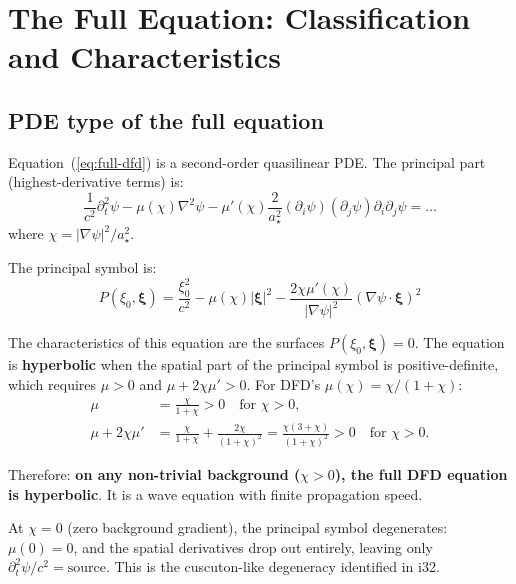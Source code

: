 \documentclass[12pt,a4paper]{article}
\begin{document}
\section{The Full Equation: Classification and Characteristics}
\label{sec:classification}

\subsection{PDE type of the full equation}

Equation~(\ref{eq:full-dfd}) is a second-order quasilinear PDE. The principal
part (highest-derivative terms) is:
\begin{equation}
\frac{1}{c^2}\partial_t^2\psi
- \mu(\chi)\nabla^2\psi
- \mu'(\chi)\frac{2}{a_\star^2}(\partial_i\psi)(\partial_j\psi)\partial_i\partial_j\psi = \ldots
\end{equation}
where $\chi = |\nabla\psi|^2/a_\star^2$.

The principal symbol is:
\begin{equation}
P(\xi_0, \boldsymbol{\xi}) = \frac{\xi_0^2}{c^2}
- \mu(\chi)|\boldsymbol{\xi}|^2
- \frac{2\chi\mu'(\chi)}{|\nabla\psi|^2}(\nabla\psi\cdot\boldsymbol{\xi})^2
\end{equation}

The characteristics of this equation are the surfaces $P(\xi_0,\boldsymbol{\xi})=0$.
The equation is \textbf{hyperbolic} when the spatial part of the principal
symbol is positive-definite, which requires $\mu > 0$ and
$\mu + 2\chi\mu' > 0$. For DFD's $\mu(\chi) = \chi/(1+\chi)$:
\begin{align}
\mu &= \frac{\chi}{1+\chi} > 0 \quad\text{for }\chi > 0, \\
\mu + 2\chi\mu' &= \frac{\chi}{1+\chi} + \frac{2\chi}{(1+\chi)^2}
= \frac{\chi(3+\chi)}{(1+\chi)^2} > 0 \quad\text{for }\chi > 0.
\end{align}

Therefore: \textbf{on any non-trivial background ($\chi > 0$), the full DFD
equation is hyperbolic}. It is a wave equation with finite propagation speed.

At $\chi = 0$ (zero background gradient), the principal symbol degenerates:
$\mu(0) = 0$, and the spatial derivatives drop out entirely, leaving only
$\partial_t^2\psi/c^2 = \text{source}$. This is the cuscuton-like degeneracy
identified in i32.
\end{document}
